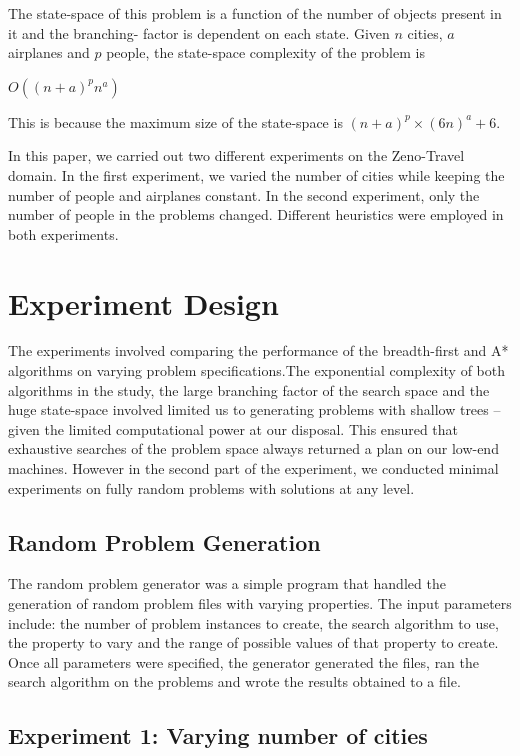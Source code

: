 \documentclass[letterpaper]{article}
\begin{document}
The state-space of this problem is a function of the number of objects present in it and the branching-
factor is dependent on each state. Given $n$ cities, $a$ airplanes and $p$ people, the state-space complexity of the problem is 
\begin{center}
$O((n+a)^pn^a)$
\end{center}
This is because the maximum size of the state-space is $ (n+a)^p \times (6n)^a + 6 $. %

In this paper, we carried out two different experiments on the Zeno-Travel domain. In the first experiment, we varied the number of cities while keeping the number of people and airplanes constant. In the second experiment, only the number of people in the problems changed. Different heuristics were employed in both experiments.

\section{Experiment Design}
The experiments involved comparing the performance of the breadth-first and A* algorithms on varying
problem specifications.The exponential complexity of both algorithms in the study, the large branching
factor of the search space and the huge state-space involved limited us to generating problems with
shallow trees – given the limited computational power at our disposal. This ensured that exhaustive
searches of the problem space always returned a plan on our low-end machines.
However in the second part of the experiment, we conducted minimal experiments on fully random problems with solutions at any level.

\subsection{Random Problem Generation}
The random problem generator was a simple program that handled the generation of random problem
files with varying properties. The input parameters include: the number of problem instances to create,
the search algorithm to use, the property to vary and the range of possible values of that property to
create.
Once all parameters were specified, the generator generated the files, ran the search algorithm on the
problems and wrote the results obtained to a file.

\subsection{Experiment 1: Varying number of cities}
\end{document}

